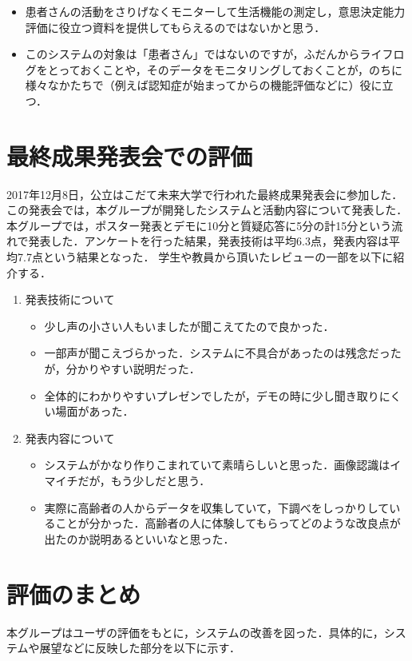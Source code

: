 \documentclass[../report]{subfiles}
\begin{document}
\begin{itemize}
    \item 患者さんの活動をさりげなくモニターして生活機能の測定し，意思決定能力評価に役立つ資料を提供してもらえるのではないかと思う．
    \item このシステムの対象は「患者さん」ではないのですが，ふだんからライフログをとっておくことや，そのデータをモニタリングしておくことが，のちに様々なかたちで（例えば認知症が始まってからの機能評価などに）役に立つ．
\end{itemize}

\section{最終成果発表会での評価}
2017年12月8日，公立はこだて未来大学で行われた最終成果発表会に参加した．
この発表会では，本グループが開発したシステムと活動内容について発表した．
本グループでは，ポスター発表とデモに10分と質疑応答に5分の計15分という流れで発表した．アンケートを行った結果，発表技術は平均6.3点，発表内容は平均7.7点という結果となった．
学生や教員から頂いたレビューの一部を以下に紹介する．

\begin{enumerate}
    \item[] 発表技術について
    \begin{itemize}
        \item 少し声の小さい人もいましたが聞こえてたので良かった．
        \item 一部声が聞こえづらかった．システムに不具合があったのは残念だったが，分かりやすい説明だった．
        \item 全体的にわかりやすいプレゼンでしたが，デモの時に少し聞き取りにくい場面があった．
    \end{itemize}

    \item[] 発表内容について
    \begin{itemize}
        \item システムがかなり作りこまれていて素晴らしいと思った．画像認識はイマイチだが，もう少しだと思う．
        \item 実際に高齢者の人からデータを収集していて，下調べをしっかりしていることが分かった．高齢者の人に体験してもらってどのような改良点が出たのか説明あるといいなと思った．
    \end{itemize}
\end{enumerate}


\section{評価のまとめ}
本グループはユーザの評価をもとに，システムの改善を図った．具体的に，システムや展望などに反映した部分を以下に示す．
\end{document}
